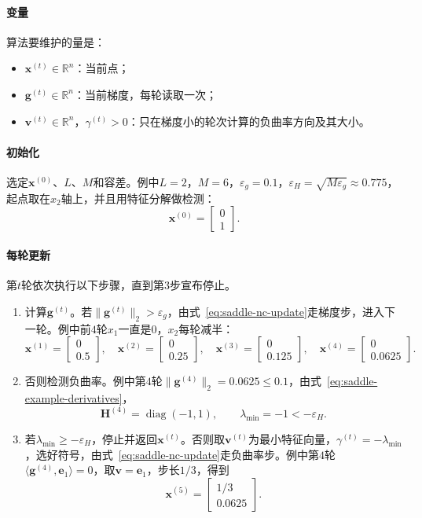 \paragraph{变量}
算法要维护的量是：
\begin{itemize}
 \item $\bm{x}^{(t)}\in\mathbb{R}^n$：当前点；
 \item $\bm{g}^{(t)}\in\mathbb{R}^n$：当前梯度，每轮读取一次；
 \item $\bm{v}^{(t)}\in\mathbb{R}^n$，$\gamma^{(t)}>0$：只在梯度小的轮次计算的负曲率方向及其大小。
\end{itemize}

\paragraph{初始化}
选定$\bm{x}^{(0)}$、$L$、$M$和容差。例中$L=2$，$M=6$，$\varepsilon_g=0.1$，$\varepsilon_H=\sqrt{M\varepsilon_g}\approx0.775$，起点取在$x_2$轴上，并且用特征分解做检测：
\[
 \bm{x}^{(0)}=\begin{bmatrix}0\\1\end{bmatrix}.
\]

\paragraph{每轮更新}
第$t$轮依次执行以下步骤，直到第$3$步宣布停止。

\begin{enumerate}
 \item 计算$\bm{g}^{(t)}$。若$\lVert\bm{g}^{(t)}\rVert_2>\varepsilon_g$，由式~\eqref{eq:saddle-nc-update}走梯度步，进入下一轮。例中前$4$轮$x_1$一直是$0$，$x_2$每轮减半：
 \[
  \bm{x}^{(1)}=\begin{bmatrix}0\\0.5\end{bmatrix},\quad
  \bm{x}^{(2)}=\begin{bmatrix}0\\0.25\end{bmatrix},\quad
  \bm{x}^{(3)}=\begin{bmatrix}0\\0.125\end{bmatrix},\quad
  \bm{x}^{(4)}=\begin{bmatrix}0\\0.0625\end{bmatrix}.
 \]
 \item 否则检测负曲率。例中第$4$轮$\lVert\bm{g}^{(4)}\rVert_2=0.0625\leq0.1$，由式~\eqref{eq:saddle-example-derivatives}，
 \[
  \bm{H}^{(4)}=\operatorname{diag}(-1,1),\qquad\lambda_{\min}=-1<-\varepsilon_H.
 \]
 \item 若$\lambda_{\min}\geq-\varepsilon_H$，停止并返回$\bm{x}^{(t)}$。否则取$\bm{v}^{(t)}$为最小特征向量，$\gamma^{(t)}=-\lambda_{\min}$，选好符号，由式~\eqref{eq:saddle-nc-update}走负曲率步。例中第$4$轮$\langle\bm{g}^{(4)},\bm{e}_1\rangle=0$，取$\bm{v}=\bm{e}_1$，步长$1/3$，得到
 \[
  \bm{x}^{(5)}=\begin{bmatrix}1/3\\0.0625\end{bmatrix}.
 \]
\end{enumerate}


